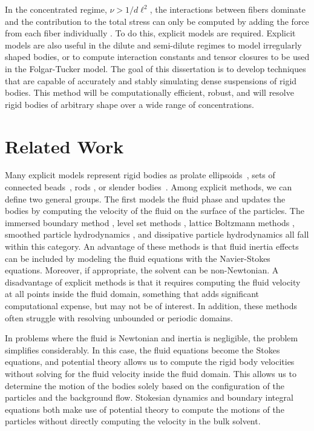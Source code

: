 In the concentrated regime, $\nu >1/d\ell^2$, the interactions between fibers dominate and the contribution to the total stress can only be computed by adding the force from each fiber individually \cite{Ausias2006, Lindstroem2008}. To do this, explicit models are required. Explicit models are also useful in the dilute and semi-dilute regimes to model irregularly shaped bodies, or to compute interaction constants and tensor closures to be used in the Folgar-Tucker model. The goal of this dissertation is to develop techniques that are capable of accurately and stably simulating dense suspensions of rigid bodies. This method will be computationally efficient, robust, and will resolve rigid bodies of arbitrary shape over a wide range of concentrations.

\section{Related Work}

Many explicit models represent rigid bodies as prolate ellipsoids~\cite{Ausias2006}, sets of connected beads~\cite{Joung2001, Yamamoto1996}, rods \cite{Lindstroem2007, Schmid2000}, or slender bodies~\cite{Fan1998,Tornberg2006, Batchelor1970a}. Among explicit methods, we can define two general groups. The first models the fluid phase and updates the bodies by computing the velocity of the fluid on the surface of the particles. The immersed boundary method \cite{Mittal2005}, level set methods \cite{Dou2007}, lattice Boltzmann methods \cite{Ladd1994a, Ladd1994b}, smoothed particle hydrodynamics \cite{Polfer2016}, and dissipative particle hydrodynamics \cite{Pivkin2010} all fall within this category. An advantage of these methods is that fluid inertia effects can be included by modeling the fluid equations with the Navier-Stokes equations. Moreover, if appropriate, the solvent can be non-Newtonian. A disadvantage of explicit methods is that it requires computing the fluid velocity at all points inside the fluid domain, something that adds significant computational expense, but may not be of interest. In addition, these methods often struggle with resolving unbounded or periodic domains. 

In problems where the fluid is Newtonian and inertia is negligible, the problem simplifies considerably. In this case, the fluid equations become the Stokes equations, and potential theory \cite{Ladyzhenskaya1963} allows us to compute the rigid body velocities without solving for the fluid velocity inside the fluid domain. This allows us to determine the motion of the bodies solely based on the configuration of the particles and the background flow. Stokesian dynamics and boundary integral equations both make use of potential theory to compute the motions of the particles without directly computing the velocity in the bulk solvent. 


